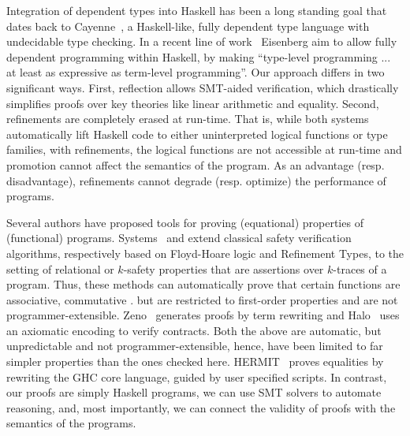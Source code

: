 %
Integration of dependent types into Haskell
has been a long standing goal that dates back
to Cayenne~\citep{cayenne}, a Haskell-like,
fully dependent type language with undecidable
type checking.
%
In a recent line of work~\citep{EisenbergS14}
Eisenberg \etal aim to allow fully dependent
programming within Haskell, by making
``type-level programming ... at least as
  expressive as term-level programming''.
%
Our approach differs in two significant ways.
%
First, reflection allows SMT-aided verification,
which drastically simplifies proofs over key theories
like linear arithmetic and equality.
%
Second, refinements are completely erased at run-time.
That is, while both systems automatically lift Haskell
code to either uninterpreted logical functions
or type families, with refinements, the logical
functions are not accessible at run-time and
promotion cannot affect the semantics of
the program.
%
As an advantage (resp. disadvantage), refinements
cannot degrade (resp. optimize)
the performance of programs.

%
Several authors have proposed tools for proving
(equational) properties of (functional) programs.
%
Systems~\citep{sousa16} and \citep{KobayashiRelational15}
extend classical safety verification algorithms,
respectively based on Floyd-Hoare logic and Refinement Types,
to the setting of relational or $k$-safety properties
that are assertions over $k$-traces of a program.
%
Thus, these methods can automatically prove that
certain functions are associative, commutative \etc.
but are restricted to first-order properties and
are not programmer-extensible.
%
Zeno~\citep{ZENO} generates proofs by term
rewriting and Halo~\citep{halo} uses an axiomatic
encoding to verify contracts.
%
Both the above are automatic, but unpredictable and not
programmer-extensible, hence, have been limited to
far simpler properties than the ones checked here.
%
HERMIT~\citep{Farmer15} proves equalities by rewriting
the GHC core language, guided by user specified scripts.
%
In contrast, our proofs are simply Haskell programs,
we can use SMT solvers to automate reasoning, and,
most importantly, we can connect the validity of
proofs with the semantics of the programs.

%
%


